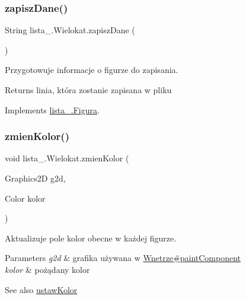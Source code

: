 \mbox{\label{classlista__5_1_1_wielokat_a6391ebe6bc42d42b6bd3041b1a6bd7bd}} 
\subsubsection{\texorpdfstring{zapisz\+Dane()}{zapiszDane()}}
{\footnotesize\ttfamily String lista\+\_.\+Wielokat.\+zapisz\+Dane (\begin{DoxyParamCaption}{ }\end{DoxyParamCaption})}

Przygotowuje informacje o figurze do zapisania. \begin{DoxyReturn}{Returns}
linia, która zostanie zapisana w pliku
\end{DoxyReturn}
 

Implements \mbox{\hyperlink{interfacelista__5_1_1_figura_a9d60d64b495755a3e48a3eee549a728d}{lista\+\_.\+Figura}}.

\mbox{\label{classlista__5_1_1_wielokat_ae863735ff7b742c4703bc142455d34ce}} 
\subsubsection{\texorpdfstring{zmien\+Kolor()}{zmienKolor()}}
{\footnotesize\ttfamily void lista\+\_.\+Wielokat.\+zmien\+Kolor (\begin{DoxyParamCaption}\item[{Graphics2D}]{g2d,  }\item[{Color}]{kolor }\end{DoxyParamCaption})}

Aktualizuje pole kolor obecne w każdej figurze. 
\begin{DoxyParams}{Parameters}
{\em g2d} & grafika używana w \mbox{\hyperlink{classlista__5_1_1_wnetrze_aa8676192e150a17230d72de122744a47}{Wnetrze\#paint\+Component}} \\
\hline
{\em kolor} & pożądany kolor \\
\hline
\end{DoxyParams}
\begin{DoxySeeAlso}{See also}
\mbox{\hyperlink{interfacelista__5_1_1_figura_a3cc13bf7229b288d743be7903b3b61a4}{ustaw\+Kolor}}
\end{DoxySeeAlso}
 


